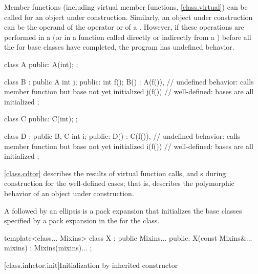 \pnum
{}%
Member functions (including virtual member functions, \ref{class.virtual}) can be
called for an object under construction.
Similarly, an object under construction can be the operand of the
operator or of a
.
However, if these operations are performed in a
(or in a function called directly or indirectly from a
)
before all the
for base classes have completed, the program has undefined behavior.
\begin{example}
\begin{codeblock}
class A {
public:
  A(int);
};

class B : public A {
  int j;
public:
  int f();
  B() : A(f()),     // undefined behavior: calls member function but base  not yet initialized
  j(f()) { }        // well-defined: bases are all initialized
};

class C {
public:
  C(int);
};

class D : public B, C {
  int i;
public:
  D() : C(f()),     // undefined behavior: calls member function but base  not yet initialized
  i(f()) { }        // well-defined: bases are all initialized
};
\end{codeblock}
\end{example}

\pnum
\begin{note}
\ref{class.cdtor} describes the results of virtual function calls,
and
s
during construction for the well-defined cases;
that is, describes the polymorphic behavior
of an object under construction.
\end{note}

\pnum
{}%
A  followed by an ellipsis is
a pack expansion that initializes the base
classes specified by a pack expansion in the 
for the class.
\begin{example}
\begin{codeblock}
template<class... Mixins>
class X : public Mixins... {
public:
  X(const Mixins&... mixins) : Mixins(mixins)... { }
};
\end{codeblock}

\end{example}

[class.inhctor.init]{Initialization by inherited constructor}%

